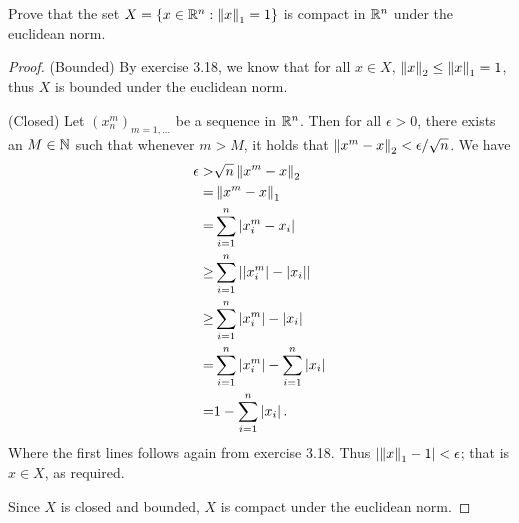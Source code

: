\begin{exercise}{8}
Prove that the set $X=\{x\in\mathbb{R}^n: \left\lVert x\right\rVert_1=1\}$ is compact in $\mathbb{R}^n$ under the euclidean norm.
\end{exercise}
\begin{proof}
(Bounded)
By exercise 3.18, we know that for all $x\in X$, $\left\lVert x\right\rVert_2 \leq \left\lVert x\right\rVert_1 = 1$, thus $X$ is bounded under the euclidean norm.

(Closed)
Let $(x^m_n)_{m=1,\dots}$ be a sequence in $\mathbb{R}^n$.
Then for all $\epsilon>0$, there exists an $M\in\mathbb{N}$ such that whenever $m>M$, it holds that $\left\lVert x^m-x\right\rVert_2<\epsilon/\sqrt{n}$.
We have
\begin{align*}
    \epsilon 
    >& \sqrt{n}\left\lVert x^m-x\right\rVert_2\\
    =& \left\lVert x^m-x\right\rVert_1\\
    =& \sum_{i=1}^n \left\lvert x^m_i-x_i\right\rvert\\
    \geq& \sum_{i=1}^n \left\lvert \left\lvert x^m_i\right\rvert-\left\lvert x_i\right\rvert\right\rvert\\
    \geq& \sum_{i=1}^n \left\lvert x^m_i\right\rvert-\left\lvert x_i\right\rvert\\
    =& \sum_{i=1}^n \left\lvert x^m_i\right\rvert- \sum_{i=1}^n\left\lvert x_i\right\rvert\\
    =& 1- \sum_{i=1}^n\left\lvert x_i\right\rvert.
\end{align*}
Where the first lines follows again from exercise 3.18.
Thus $\left\lvert \left\lVert x\right\rVert_1-1\right\rvert<\epsilon$;
that is $x\in X$, as required.

Since $X$ is closed and bounded, $X$ is compact under the euclidean norm.
\end{proof} 

